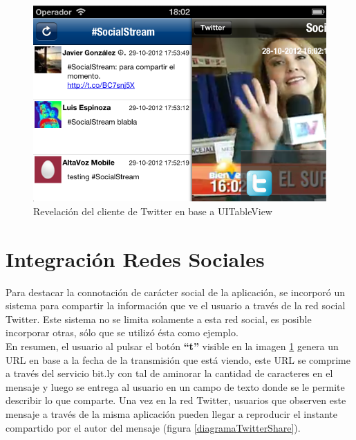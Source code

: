 \begin{figure}[H]
	\centering
	\includegraphics[scale=0.4]{imgs/sshot-twitterclientvc.png}
	\caption{Revelación del cliente de Twitter en base a UITableView}	
	\label{sshot-twitterclientvc}
\end{figure}
 
 
\section{Integración Redes Sociales}
	Para destacar la connotación de carácter social de la aplicación, se incorporó un sistema para compartir la información que ve el usuario a través de la red social Twitter. Este sistema no se limita solamente a esta red social, es posible incorporar otras, sólo que se utilizó ésta como ejemplo.\\
	
	En resumen, el usuario al pulsar el botón \textbf{\textquotedblleft t\textquotedblright} visible en la imagen \ref{sshot-twitterclientvc} genera un URL en base a la fecha de la transmisión que está viendo, este URL se comprime a través del servicio bit.ly con tal de aminorar la cantidad de caracteres en el mensaje y luego se entrega al usuario en un campo de texto donde se le permite describir lo que comparte. Una vez en la red Twitter, usuarios que observen este mensaje a través de la misma aplicación pueden llegar a reproducir el instante compartido por el autor del mensaje (figura \ref{diagramaTwitterShare}).
	

